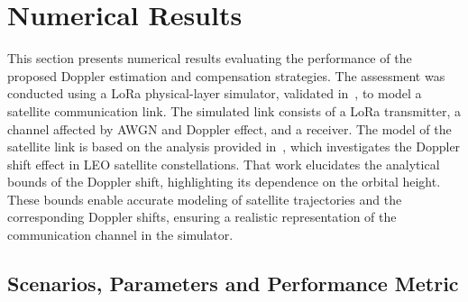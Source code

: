 \documentclass{IEEEtran}
\begin{document}
\section{Numerical Results}
\label{sec:numerical_results}

This section presents numerical results evaluating the performance of the proposed Doppler estimation and compensation strategies. The assessment was conducted using a \ac{LoRa} physical-layer simulator, validated in~\cite{Pasolini.2022}, to model a satellite communication link. The simulated link consists of a \ac{LoRa} transmitter, a channel affected by \ac{AWGN} and Doppler effect, and a receiver. The model 
 of the satellite link is based on the analysis provided in~\cite{Hourani.2024}, which investigates the Doppler shift effect in \ac{LEO} satellite constellations. That work elucidates the analytical bounds of the Doppler shift, highlighting its dependence on the orbital height. These bounds enable accurate modeling of satellite trajectories and the corresponding Doppler shifts, ensuring a realistic representation of the communication channel in the simulator.

\subsection{Scenarios, Parameters and Performance Metric}
\end{document}
